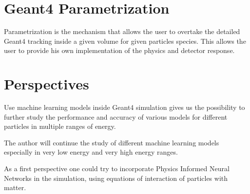 \documentclass[11pt,a4paper]{report}
\begin{document}
	\chapter{\sc Geant4 Parametrization}
	Parametrization is the mechanism that allows the user to overtake the detailed Geant4 tracking inside a given volume for given particles species. This allows the user to provide his own implementation of the physics and detector response.

	\chapter{\sc Perspectives}
	Use machine learning models inside Geant4 simulation gives us the possibility to further study the performance and accuracy of various models for different particles in multiple ranges of energy.

	The author will continue the study of different machine learning models especially in very low energy and very high energy ranges.


	As a first perspective one could try to incorporate Physics Informed Neural Networks in the simulation, using equations of interaction of particles with matter.
\end{document}
